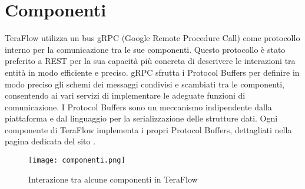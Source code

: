 \section{Componenti}
TeraFlow utilizza un bus gRPC (Google Remote Procedure Call) come protocollo interno per la 
comunicazione tra le sue componenti. Questo protocollo è stato preferito a REST per la sua capacità più concreta di descrivere le interazioni tra entità in modo efficiente e preciso.
gRPC sfrutta i Protocol Buffers per definire in modo preciso gli schemi dei messaggi condivisi e scambiati tra le componenti,  consentendo ai vari servizi di implementare le adeguate funzioni di comunicazione.
I Protocol Buffers sono un meccanismo indipendente dalla piattaforma e dal linguaggio per la serializzazione delle strutture dati. Ogni componente di TeraFlow implementa i propri 
Protocol Buffers, dettagliati nella pagina dedicata del sito \cite{ProtoBuf}.
\begin{figure}[h]
    \centering
   \texttt{[image: componenti.png]}
    \caption{Interazione tra alcune componenti in TeraFlow}
    \label{fig:componenti}
\end{figure}

